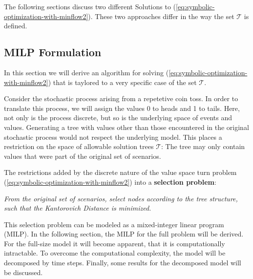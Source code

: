 \documentclass[a4paper, 12pt] {article}
\begin{document}
The following sections discuss two different Solutions to (\ref{eq:symbolic-optimization-with-minflow2}). These two approaches differ in the way the set $\mathcal{T}$ is defined.
\subsection{MILP Formulation}
\label{sec:MILP-selection-problem}
In this section we will derive an algorithm for solving (\ref{eq:symbolic-optimization-with-minflow2}) that is taylored to a very specific case of the set $\mathcal{T}$.

Consider the stochastic process arising from a repetetive coin toss. In order to translate this process, we will assign the values 0 to heads and 1 to tails. Here, not only is the process discrete, but so is the underlying space of events and values. Generating a tree with values other than those encountered in the original stochastic process would not respect the underlying model. This places a restriction on the space of allowable solution trees $\mathcal{T}$: The tree may only contain values that were part of the original set of scenarios.

The restrictions added by the discrete nature of the value space turn problem (\ref{eq:symbolic-optimization-with-minflow2}) into a \textbf{selection problem}:
\begin{center}
  \textit{From the original set of scenarios, select nodes according to the tree structure, such that the Kantorovich Distance is minimized.}
\end{center}
This selection problem can be modeled as a mixed-integer linear program (MILP). In the following section, the MILP for the full problem will be derived. For the full-size model it will become apparent, that it is computationally intractable. To overcome the computational complexity, the model will be decomposed by time steps. Finally, some results for the decomposed model will be discussed.
\end{document}
